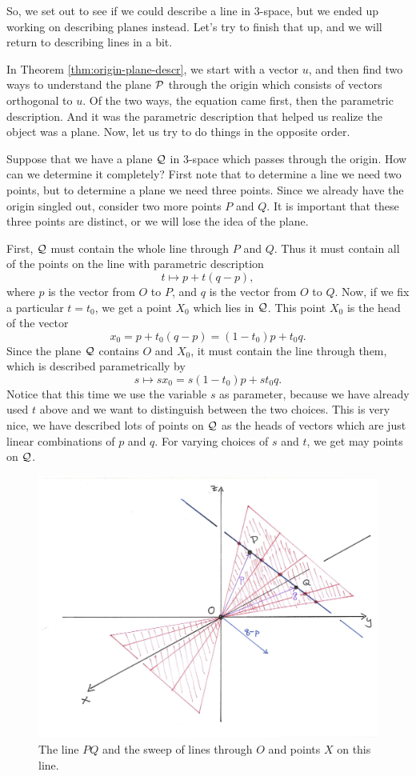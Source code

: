 \documentclass[00-livre-main.tex]{subfiles}
\begin{document}
So, we set out to see if we could describe a line in $3$-space, but we ended up working on describing planes instead. Let's try to finish that up, and we will return to describing lines in a bit.

In Theorem \ref{thm:origin-plane-descr}, we start with a vector $u$, and then find two ways to understand the plane $\mathcal{P}$ through the origin which consists of vectors orthogonal to $u$. Of the two ways, the equation came first, then the parametric description. And it was the parametric description that helped us realize the object was a plane. 
Now, let us try to do things in the opposite order. 

Suppose that we have a plane $\mathcal{Q}$ in $3$-space which passes through the origin. How can we determine it completely? First note that to determine a line we need two points, but to determine a plane we need three points. Since we already have the origin singled out, consider two more points $P$ and $Q$. It is important that these three points are distinct, or we will lose the idea of the plane. 

First, $\mathcal{Q}$ must contain the whole line through $P$ and $Q$. Thus it must contain all of the points on the line with parametric description
\[
t \mapsto p + t(q-p),
\]
where $p$ is the vector from $O$ to $P$, and $q$ is the vector from $O$ to $Q$. Now, if we fix a particular $t=t_0$, we get a point $X_0$ which lies in $\mathcal{Q}$. This point $X_0$ is the head of the vector 
\[
x_0 = p + t_0 (q-p) = (1-t_0) p + t_0 q.
\]
Since the plane $\mathcal{Q}$ contains $O$ and $X_0$, it must contain the line through them, which is described parametrically by
\[
s \mapsto s x_0 = s(1-t_0) p + st_0 q.
\]
Notice that this time we use the variable $s$ as parameter, because we have already used $t$ above and we want to distinguish between the two choices. This is very nice, we have described lots of points on $\mathcal{Q}$ as the heads of vectors which are just linear combinations of $p$ and $q$. For varying choices of $s$ and $t$, we get may points on $\mathcal{Q}$.

\begin{figure}[ht]
\centering
\includegraphics[width=\textwidth]{images/plane-sweep.png}
\caption{The line $PQ$ and the sweep of lines through $O$ and points $X$ on this line.}
\label{fig:parametric-plane-O}
\end{figure}
\end{document}
